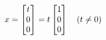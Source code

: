 \documentclass[preview]{standalone}
\begin{document}
\begin{align*}
\special{dvisvgm:raw <g id='unique000'>}x = \begin{bmatrix} t \\ 0 \\ 0 \end{bmatrix} = t \begin{bmatrix} 1 \\ 0 \\ 0 \end{bmatrix} \quad (t \neq 0)\special{dvisvgm:raw </g>}
\end{align*}
\end{document}
